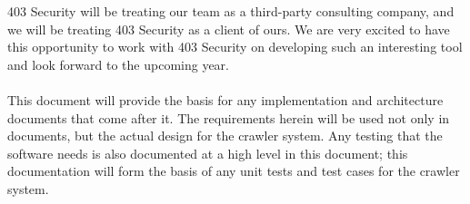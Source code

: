 403 Security will be treating our team as a third-party consulting company, and we will be treating 403 Security as a client of ours. We are very excited to have this opportunity to work with 403 Security on developing such an interesting tool and look forward to the upcoming year.\\\\
This document will provide the basis for any implementation and architecture documents that come after it.  The requirements herein will be used not only in documents, but the actual design for the crawler system.  Any testing that the software needs is also documented at a high level in this document; this documentation will form the basis of any unit tests and test cases for the crawler system.
